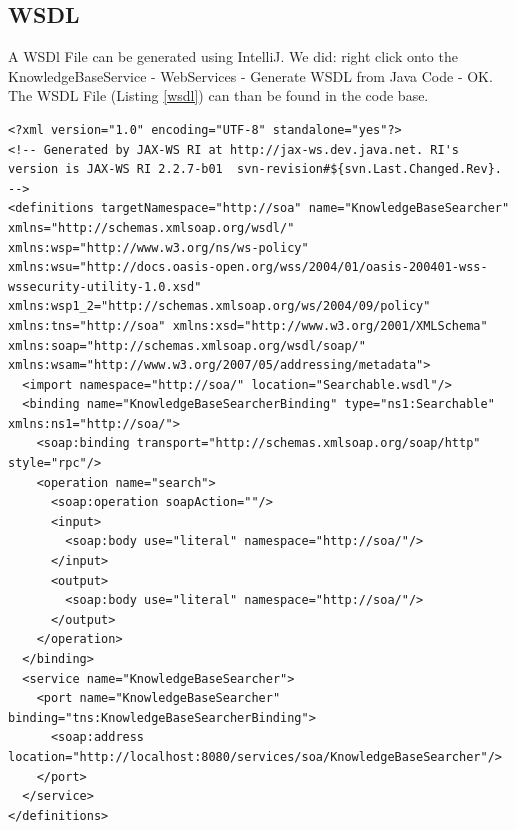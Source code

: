 \documentclass[12pt]{article}
\begin{document}
\subsection{WSDL}
A WSDl File can be generated using IntelliJ. We did: right click onto the KnowledgeBaseService - WebServices - Generate WSDL from Java Code - OK.\\
The WSDL File (Listing \ref{wsdl}) can than be found in the code base.
\begin{lstlisting}[caption=WSDL File for the KnowledgeBaseSearcher class, label=wsdl]
<?xml version="1.0" encoding="UTF-8" standalone="yes"?>
<!-- Generated by JAX-WS RI at http://jax-ws.dev.java.net. RI's version is JAX-WS RI 2.2.7-b01  svn-revision#${svn.Last.Changed.Rev}. -->
<definitions targetNamespace="http://soa" name="KnowledgeBaseSearcher" xmlns="http://schemas.xmlsoap.org/wsdl/" xmlns:wsp="http://www.w3.org/ns/ws-policy" xmlns:wsu="http://docs.oasis-open.org/wss/2004/01/oasis-200401-wss-wssecurity-utility-1.0.xsd" xmlns:wsp1_2="http://schemas.xmlsoap.org/ws/2004/09/policy" xmlns:tns="http://soa" xmlns:xsd="http://www.w3.org/2001/XMLSchema" xmlns:soap="http://schemas.xmlsoap.org/wsdl/soap/" xmlns:wsam="http://www.w3.org/2007/05/addressing/metadata">
  <import namespace="http://soa/" location="Searchable.wsdl"/>
  <binding name="KnowledgeBaseSearcherBinding" type="ns1:Searchable" xmlns:ns1="http://soa/">
    <soap:binding transport="http://schemas.xmlsoap.org/soap/http" style="rpc"/>
    <operation name="search">
      <soap:operation soapAction=""/>
      <input>
        <soap:body use="literal" namespace="http://soa/"/>
      </input>
      <output>
        <soap:body use="literal" namespace="http://soa/"/>
      </output>
    </operation>
  </binding>
  <service name="KnowledgeBaseSearcher">
    <port name="KnowledgeBaseSearcher" binding="tns:KnowledgeBaseSearcherBinding">
      <soap:address location="http://localhost:8080/services/soa/KnowledgeBaseSearcher"/>
    </port>
  </service>
</definitions>
\end{lstlisting}
\end{document}
